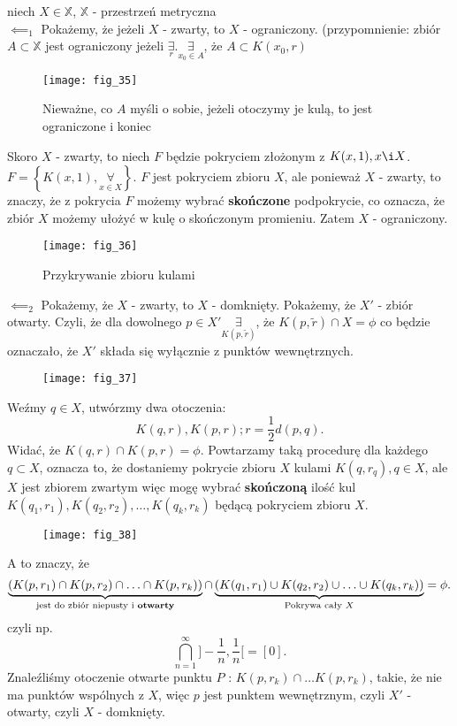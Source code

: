 \documentclass[../main.tex]{subfiles}
\begin{document}
    \begin{dowod}
        niech $X\in\mathbb{X}$, $\mathbb{X}$ - przestrzeń metryczna\\
        $\impliedby_1$ Pokażemy, że jeżeli $X$ - zwarty, to $X$ - ograniczony. (przypomnienie: zbiór $A\subset\mathbb{X}$ jest ograniczony jeżeli $\underset{r}{\exists} . \underset{x_0\in A}{\exists} $, że $A\subset K(x_0,r)$
        \begin{figure}[h]
            \centering
            \texttt{[image: fig\_35]}
            \caption{Nieważne, co $A$ myśli o sobie, jeżeli otoczymy je kulą, to jest ograniczone i koniec}
        \end{figure}
        Skoro $X$ - zwarty, to niech $F$ będzie pokryciem złożonym z $K(x,1), x\i X$. $F = \left\{ K(x,1), \underset{x\in X}{\forall}  \right\} $. $F$ jest pokryciem zbioru $X$, ale ponieważ $X$ - zwarty, to znaczy, że z pokrycia $F$ możemy wybrać \textbf{skończone} podpokrycie, co oznacza, że zbiór $X$ możemy ułożyć w kulę o skończonym promieniu. Zatem $X$ - ograniczony.
        \begin{figure}[h]
            \centering
            \texttt{[image: fig\_36]}
            \caption{Przykrywanie zbioru kulami}
        \end{figure}

        $\impliedby_2$ Pokażemy, że $X$ - zwarty, to $X$ - domknięty. Pokażemy, że $X'$ - zbiór otwarty.
        Czyli, że dla dowolnego $p\in X' \underset{K(p,\tilde r)}{\exists} $, że $K(p,\tilde r)\cap X = \phi$ co będzie oznaczało, że $X'$ składa się wyłącznie z punktów wewnętrznych.
        \begin{figure}[h]
            \centering
            \texttt{[image: fig\_37]}
        \end{figure}
    Weźmy $q\in X$, utwórzmy dwa otoczenia:
    \[
        K(q,r), K(p,r); r=\frac{1}{2}d(p,q)
    .\]
    Widać, że $K(q,r) \cap K(p,r) = \phi$. Powtarzamy taką procedurę dla każdego $q\subset X$,
    oznacza to, że dostaniemy pokrycie zbioru $X$ kulami $K(q,r_q), q\in X$, ale $X$ jest zbiorem zwartym więc mogę wybrać \textbf{skończoną} ilość kul \\
    $K(q_1,r_1), K(q_2,r_2),\ldots,K(q_k,r_k)$ będącą pokryciem zbioru $X$.
    \begin{figure}[h]
        \centering
        \texttt{[image: fig\_38]}
    \end{figure}
    A to znaczy, że
    \[
        \underbrace{\left( K(p,r_1)\cap K(p,r_2) \cap \ldots \cap K(p,r_k) \right)}_{\text{jest do zbiór niepusty i \textbf{otwarty}}} \cap \underbrace{\left( K(q_1,r_1) \cup K(q_2,r_2) \cup \ldots \cup K(q_k,r_k) \right)}_{\text{Pokrywa cały $X$}} = \phi
    .\]
    czyli np. \[
        \bigcap_{n=1}^\infty ]-\frac{1}{n}, \frac{1}{n}[ = [0]
    .\]
    Znaleźliśmy otoczenie otwarte punktu $P$ : $K(p,r_k) \cap \ldots K(p,r_k)$, takie, że nie ma punktów wspólnych z $X$, więc $p$ jest punktem wewnętrznym, czyli  $X'$ - otwarty, czyli $X$ - domknięty.


\end{dowod}
\end{document}
